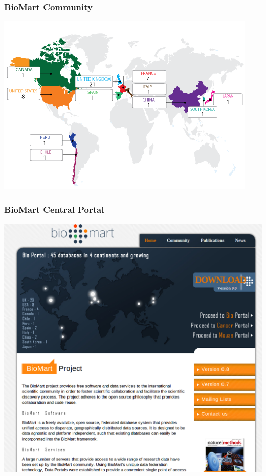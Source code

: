 \documentclass{beamer}
\begin{document}
\begin{frame}
  \frametitle{BioMart Community}
  
  \begin{center}
    \href{http://central.biomart.org/}{\includegraphics[width=\linewidth]{mapa}}
  \end{center}

\end{frame}


\begin{frame}
  \frametitle{BioMart Central Portal}
  
  \begin{center}
    \href{http://central.biomart.org/}{\includegraphics[width=\linewidth]{biomart_central}}
  \end{center}

\end{frame}
\end{document}
